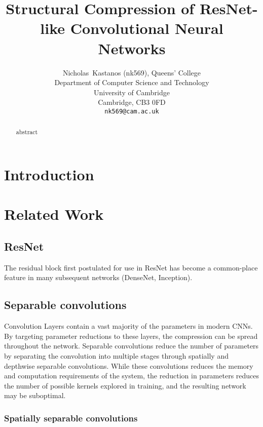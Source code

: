 \documentclass{article}
\title{Structural Compression of ResNet-like Convolutional Neural Networks}
\author{%
	Nicholas~Kastanos (nk569), Queens' College \\
	Department of Computer Science and Technology\\
	University of Cambridge\\
	Cambridge, CB3 0FD\\
	\texttt{nk569@cam.ac.uk} \\
}
\begin{document}
	
	\maketitle
	
	\begin{abstract}
		abstract
	\end{abstract}
	
	\section{Introduction}
	
	
	
	
	\section{Related Work}
	\subsection{ResNet}
	
	The residual block first postulated for use in ResNet has become a common-place feature in many subsequent networks (DenseNet, Inception). 
	
	\subsection{Separable convolutions}
	
	Convolution Layers contain a vast majority of the parameters in modern CNNs. By targeting parameter reductions to these layers, the compression can be spread throughout the network. Separable convolutions reduce the number of parameters by separating the convolution into multiple stages through spatially and depthwise separable convolutions. While these convolutions reduces the memory and computation requirements of the system, the reduction in parameters reduces the number of possible kernels explored in training, and the resulting network may be suboptimal.
	
	\subsubsection{Spatially separable convolutions}
	
\end{document}
